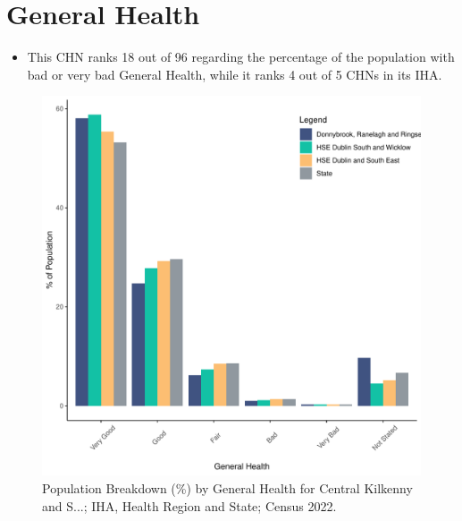 \documentclass{article}
\begin{document}
\pagebreak

\section{General Health}\label{sect:GenHealth}
\begin{itemize}
\item  This CHN ranks  18 out of 96 regarding the percentage of the population with bad or very bad General Health, while it ranks   4 out of 5 CHNs in its IHA.
\end{itemize}
\begin{figure}[h]
	\centering
	\includegraphics[width = 150mm]{../figures/GenED.pdf}
	\caption{Population Breakdown (\%) by General Health for Central Kilkenny and S...; IHA, Health Region and State;  Census 2022.}
	\label{fig:2ae19629-1a6a-13a3-e055-000000000001}
	\end{figure}
\end{document}
